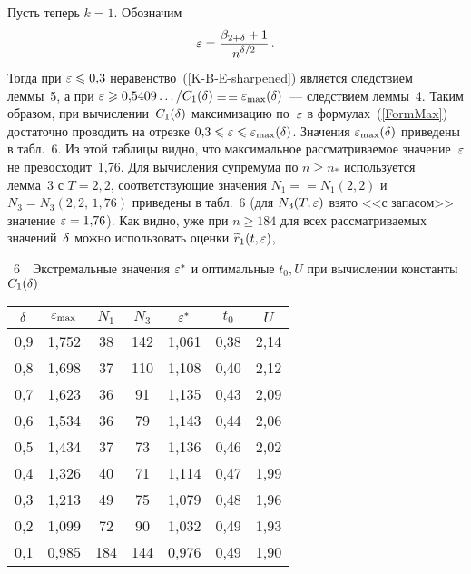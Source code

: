 \begin{multicols}{2}
Пусть теперь $k=1$. Обозначим
$$
\varepsilon=\displaystyle\frac{\displaystyle \beta_{2+\delta}+1\mathstrut}{\displaystyle n^{\delta/2}\mathstrut}\,.
$$
Тогда при $\varepsilon\leqslant0{,}3$ неравенство~(\ref{K-B-E-sharpened}) является
следствием леммы~5, а при $\varepsilon\geqslant
0{,}5409\ldots/C_1(\delta)\equiv$\linebreak $\equiv\varepsilon_{\max}(\delta)$~--- следствием
леммы~4. Таким образом, при вычислении~$C_1(\delta)$
максимизацию по~$\varepsilon$ в формулах~(\ref{FormMax}) достаточно
проводить на отрезке $0{,}3\leqslant\varepsilon\leqslant\varepsilon_{\max}(\delta)$. Значения
$\varepsilon_{\max}(\delta)$ приведены в
табл.~6. Из этой таблицы видно,
что максимальное рассматриваемое значение~$\varepsilon$ не превосходит~1,76. 
Для вычисления супремума по $n\ge n_*$ используется
лемма~3 с $T=2{,}2$, соответствующие значения
$N_1=$\linebreak $=N_1(2{,}2)$ и $N_3=N_3(2{,}2,\,1{,}76)$ приведены в
табл.~6 (для $N_3(T,\varepsilon)$ взято
<<с запасом>> значение $\varepsilon=1{,}76$). Как видно, уже при $n\ge184$
для всех рассматриваемых значений~$\delta$ можно использовать оценки
$\widetilde r_1(t,\varepsilon)$, \linebreak\vspace*{-12pt}
\pagebreak


\noindent
\begin{center} %
\vspace*{-8pt}

\noindent
\parbox{79mm}{{\tablename~6}\ \ \small{Экстремальные значения
$\varepsilon^*$ и оптимальные $t_0,U$ при вычислении константы
$C_1(\delta)$}}
\vspace*{2ex}

{\small 
\tabcolsep=8pt
\begin{tabular}{|c|c|c|c|c|c|c|}
  \hline
$\delta$ & $\varepsilon_{\max}$ & $N_1$ & $N_3$ & $\varepsilon^*$ & $t_0$ & $U$\\
\hline 0,9& 1,752& 38& 142& 1,061& 0,38& 2,14\\
0,8& 1,698& 37& 110& 1,108& 0,40& 2,12\\
0,7& 1,623& 36& 91& 1,135& 0,43& 2,09\\
0,6& 1,534& 36& 79& 1,143& 0,44& 2,06\\
0,5& 1,434& 37& 73& 1,136& 0,46& 2,02\\
0,4& 1,326& 40& 71& 1,114& 0,47& 1,99\\
0,3& 1,213& 49& 75& 1,079& 0,48& 1,96\\
0,2& 1,099& 72& 90& 1,032& 0,49& 1,93\\
0,1& 0,985& 184& 144& 0,976& 0,49& 1,90\\
\hline
\end{tabular}
}
\end{center}


\end{multicols}
